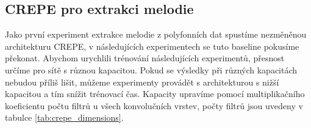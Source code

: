 \subsection{CREPE pro extrakci melodie}

Jako první experiment extrakce melodie z polyfonních dat spustíme nezměněnou architekturu CREPE, v následujících experimentech se tuto baseline pokusíme překonat. Abychom urychlili trénování následujících experimentů, přesnost určíme pro sítě s různou kapacitou. Pokud se výsledky při různých kapacitách nebudou příliš lišit, můžeme experimenty provádět s architekturou s nižší kapacitou a tím snížit trénovací čas. Kapacity upravíme pomocí multiplikačního koeficientu počtu filtrů u všech konvolučních vrstev, počty filtrů jsou uvedeny v tabulce \ref{tab:crepe_dimensions}.


